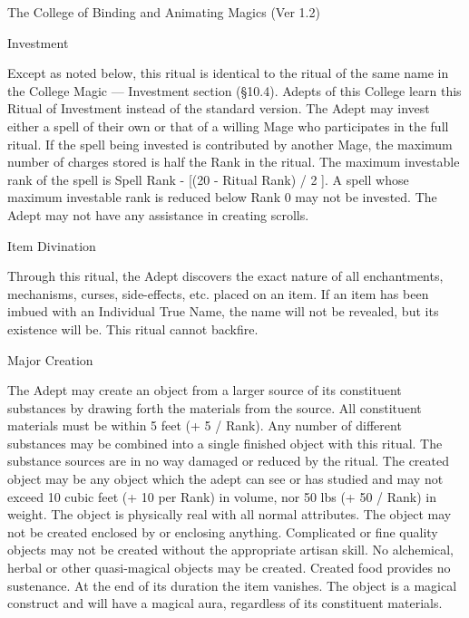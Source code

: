 \begin{Chapter}{The College of Binding and Animating Magics (Ver 1.2)}
\begin{ritual}[R-2]{Investment}
\begin{effects}
Except as noted below, this ritual is identical to the ritual of the
same name in the College Magic --- Investment section (§10.4).  Adepts
of this College learn this Ritual of Investment instead of the
standard version.  The Adept may invest either a spell of their own or
that of a willing Mage who participates in the full ritual. If the
spell being invested is contributed by another Mage, the maximum
number of charges stored is half the Rank in the ritual.  The maximum
investable rank of the spell is Spell Rank - [(20 - Ritual Rank) / 2
].  A spell whose maximum investable rank is reduced below Rank 0 may
not be invested. The Adept may not have any assistance in creating
scrolls.
\end{effects}
\end{ritual}

\begin{ritual}[R-3]{Item Divination}
\begin{effects}
Through this ritual, the Adept discovers the exact nature of all
enchantments, mechanisms, curses, side-effects, etc.  placed on an
item.  If an item has been imbued with an Individual True Name, the
name will not be revealed, but its existence will be. This ritual
cannot backfire.
\end{effects}
\end{ritual}

\begin{ritual}[R-4]{Major Creation}
\begin{effects}
The Adept may create an object from a larger source of its constituent
substances by drawing forth the materials from the source.  All
constituent materials must be within 5 feet (+ 5 / Rank). Any number
of different substances may be combined into a single finished object
with this ritual.  The substance sources are in no way damaged or
reduced by the ritual.  The created object may be any object which the
adept can see or has studied and may not exceed 10 cubic feet (+ 10
per Rank) in volume, nor 50 lbs (+ 50 / Rank) in weight.  The object
is physically real with all normal attributes.  The object may not be
created enclosed by or enclosing anything.  Complicated or fine
quality objects may not be created without the appropriate artisan
skill.  No alchemical, herbal or other quasi-magical objects may be
created.  Created food provides no sustenance. At the end of its
duration the item vanishes. The object is a magical construct and will
have a magical aura, regardless of its constituent materials.
\end{effects}
\end{ritual}


\end{Chapter}
